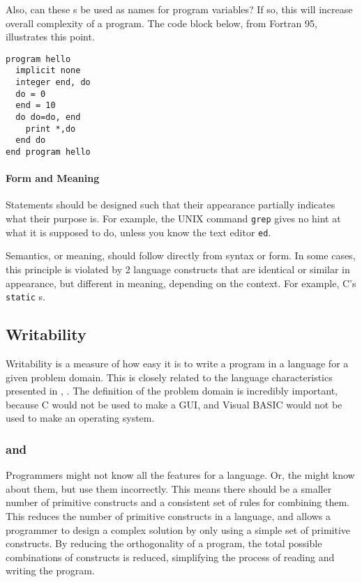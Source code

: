 Also, can these s be used as names for program variables?
If so, this will increase overall complexity of a program.
The code block below, from Fortran 95, illustrates this point.
\begin{verbatim}
program hello
  implicit none
  integer end, do
  do = 0
  end = 10
  do do=do, end
    print *,do
  end do
end program hello
\end{verbatim}

\paragraph{Form and Meaning}\label{par:Syntax_Form_Meaning}
Statements should be designed such that their appearance partially indicates what their purpose is.
For example, the UNIX command \texttt{grep} gives no hint at what it is supposed to do, unless you know the text editor \texttt{ed}.

Semantics, or meaning, should follow directly from syntax or form.
In some cases, this principle is violated by 2 language constructs that are identical or similar in appearance, but different in meaning, depending on the context.
For example, C's \texttt{static} s.

\subsection{Writability}\label{subsec:Writability}
Writability is a measure of how easy it is to write a program in a language for a given problem domain.
This is closely related to the language characteristics presented in , .
The definition of the problem domain is incredibly important, because C would not be used to make a GUI, and Visual BASIC would not be used to make an operating system.

\subsubsection{ and }\label{subsubsec:Written_Simplicity_Orthogonality}
Programmers might not know all the features for a language.
Or, the might know about them, but use them incorrectly.
This means there should be a smaller number of primitive constructs and a consistent set of rules for combining them.
This reduces the number of primitive constructs in a language, and allows a programmer to design a complex solution by only using a simple set of primitive constructs.
By reducing the orthogonality of a program, the total possible combinations of constructs is reduced, simplifying the process of reading and writing the program.

